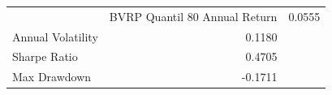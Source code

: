 \begin{tabular}{lr}
\toprule
 & BVRP Quantil 80%
\midrule
Annual Return & 0.0555 \\
Annual Volatility & 0.1180 \\
Sharpe Ratio & 0.4705 \\
Max Drawdown & -0.1711 \\
\bottomrule
\end{tabular}
